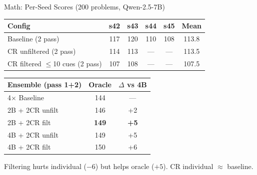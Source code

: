 \documentclass[10pt]{beamer}
\begin{document}
\begin{frame}{Math: Per-Seed Scores (200 problems, Qwen-2.5-7B)}
  \begin{table}
    \footnotesize
    \begin{tabular}{@{} l cccc c @{}}
      \toprule
      Config & s42 & s43 & s44 & s45 & Mean \\
      \midrule
      Baseline (2 pass) & 117 & 120 & 110 & 108 & 113.8 \\
      CR unfiltered (2 pass) & 114 & 113 & --- & --- & 113.5 \\
      CR filtered $\leq$10 cues (2 pass) & 107 & 108 & --- & --- & 107.5 \\
      \bottomrule
    \end{tabular}
  \end{table}

  \vspace{0.5em}
  \begin{table}
    \footnotesize
    \begin{tabular}{@{} l c c @{}}
      \toprule
      Ensemble (pass 1+2) & Oracle & $\Delta$ vs 4B \\
      \midrule
      4$\times$ Baseline & 144 & --- \\
      2B + 2CR unfilt & 146 & +2 \\
      2B + 2CR filt & \textbf{149} & \textbf{+5} \\
      4B + 2CR unfilt & 149 & +5 \\
      4B + 2CR filt & 150 & +6 \\
      \bottomrule
    \end{tabular}
  \end{table}

  \vspace{0.3em}
  {\footnotesize Filtering hurts individual ($-6$) but helps oracle ($+5$). CR individual $\approx$ baseline.}
\end{frame}
\end{document}
